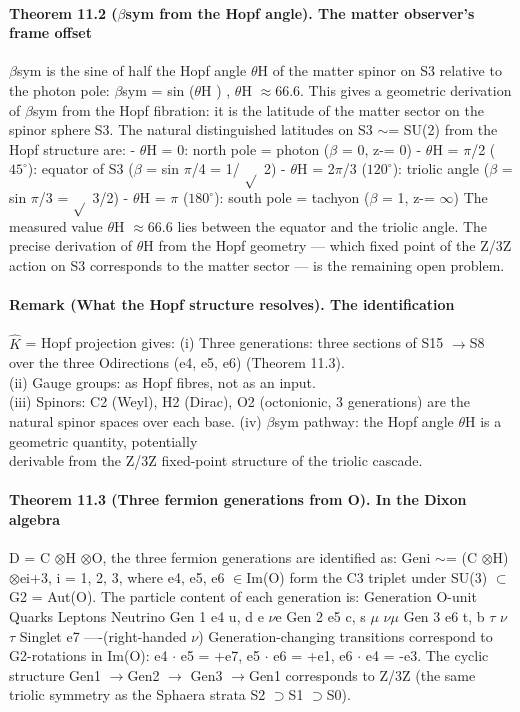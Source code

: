 \documentclass[12pt,a4paper]{article}
\begin{document}
\paragraph*{Theorem 11.2 ($\beta$sym from the Hopf angle). The matter observer's frame offset}
$\beta$sym is the sine of half the Hopf angle $\theta$H of the matter spinor on S3 relative to the photon pole: $\beta$sym = sin ($\theta$H ) , $\theta$H $\approx$66.6. This gives a geometric derivation of $\beta$sym from the Hopf fibration: it is the latitude of the matter sector on the spinor sphere S3. The natural distinguished latitudes on S3 $\sim$= SU(2) from the Hopf structure are:
- $\theta$H = 0: north pole = photon ($\beta$ = 0, z-= 0)
- $\theta$H = $\pi$/2 ($45^\circ$): equator of S3 ($\beta$ = sin $\pi$/4 = 1/
$\sqrt{}$ 2)
- $\theta$H = 2$\pi$/3 ($120^\circ$): triolic angle ($\beta$ = sin $\pi$/3 =
$\sqrt{}$ 3/2)
- $\theta$H = $\pi$ ($180^\circ$): south pole = tachyon ($\beta$ = 1, z-= $\infty$)
The measured value $\theta$H $\approx$66.6 lies between the equator and the triolic angle. The precise derivation of $\theta$H from the Hopf geometry --- which fixed point of the Z/3Z action on S3 corresponds to the matter sector --- is the remaining open problem.
\paragraph*{Remark (What the Hopf structure resolves). The identification}
$\hat K$ = Hopf projection gives:
(i) Three generations: three sections of S15 $\to$S8 over the three Odirections (e4, e5, e6) (Theorem 11.3).\\
(ii) Gauge groups: as Hopf fibres, not as an input.\\
(iii) Spinors: C2 (Weyl), H2 (Dirac), O2 (octonionic, 3 generations) are the\\
natural spinor spaces over each base.
(iv) $\beta$sym pathway: the Hopf angle $\theta$H is a geometric quantity, potentially\\
derivable from the Z/3Z fixed-point structure of the triolic cascade.
\paragraph*{Theorem 11.3 (Three fermion generations from O). In the Dixon algebra}
D = C $\otimes$H $\otimes$O, the three fermion generations are identified as: Geni $\sim$= (C $\otimes$H) $\otimes$ei+3, i = 1, 2, 3, where e4, e5, e6 $\in$Im(O) form the C3 triplet under SU(3) $\subset$G2 = Aut(O). The particle content of each generation is:
Generation O-unit Quarks Leptons Neutrino Gen 1 e4 u, d e $\nu$e Gen 2 e5 c, s $\mu$ $\nu$$\mu$ Gen 3 e6 t, b $\tau$ $\nu$$\tau$ Singlet e7 ----(right-handed $\nu$) Generation-changing transitions correspond to G2-rotations in Im(O): e4 $\cdot$ e5 = +e7, e5 $\cdot$ e6 = +e1, e6 $\cdot$ e4 = -e3. The cyclic structure Gen1 $\to$Gen2 $\to$ Gen3 $\to$Gen1 corresponds to Z/3Z (the same triolic symmetry as the Sphaera strata S2 $\supset$S1 $\supset$S0).
\end{document}
